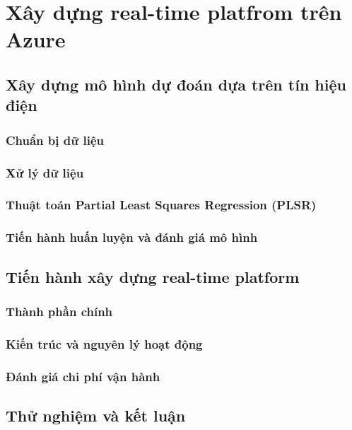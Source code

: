 \chapter{Xây dựng real-time platfrom trên Azure}

\section{Xây dựng mô hình dự đoán dựa trên tín hiệu điện}
\subsection{Chuẩn bị dữ liệu}
\subsection{Xử lý dữ liệu}
\subsection{Thuật toán Partial Least Squares Regression (PLSR)}
\subsection{Tiến hành huấn luyện và đánh giá mô hình}
\section{Tiến hành xây dựng real-time platform}
\subsection{Thành phần chính}
\subsection{Kiến trúc và nguyên lý hoạt động}
\subsection{Đánh giá chi phí vận hành}
\section{Thử nghiệm và kết luận}
